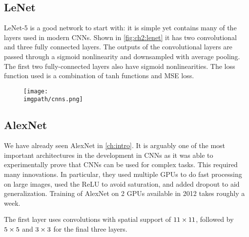 \subsection{LeNet}
LeNet-5 \cite{lecun_gradient-based_1998} is a good network to start with: it
is simple yet contains many of the layers used in modern CNNs. Shown in
\autoref{fig:ch2:lenet} it has two convolutional and three fully connected
layers. The outputs of the convolutional layers are passed through a sigmoid
nonlinearity and downsampled with average pooling. The first two fully-connected
layers also have sigmoid nonlinearities. The loss function used is a combination
of tanh functions and MSE loss.

\begin{figure}
  \centering
  \texttt{[image: \\imgpath/cnns.png]}
  \label{fig:ch2:lenet}
\end{figure}

\subsection{AlexNet}
We have already seen AlexNet \cite{krizhevsky_imagenet_2012} in \autoref{ch:intro}. 
It is arguably one of the most important architectures in the development in CNNs as it 
was able to experimentally prove that CNNs can be used for complex tasks. This
required many innovations. In particular, they used multiple GPUs to do fast
processing on large images, used the ReLU to avoid saturation, and added dropout
to aid generalization. Training of AlexNet on 2 GPUs available in 2012 takes
roughly a week.

The first layer uses convolutions with spatial support of $11\times11$, followed
by $5\times 5$ and $3\times 3$ for the final three layers.


